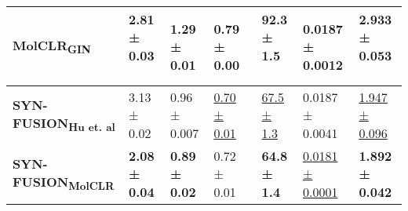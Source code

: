 \documentclass[sigconf,nonacm]{acmart}
\begin{document}
\begin{table*}[!t]
\begin{tabular}[width=0.8\linewidth]{llll|lll}
\textbf{MolCLR}\textsubscript{\textbf{GIN}} \cite{Wang_2022} &2.81 ± 0.03 ~ &1.29 ± 0.01 & 0.79 ± 0.00~ & 92.3 ± 1.5 ~ & 0.0187 ± 0.0012 & 2.933 ± 0.053 ~ \\  

     
       
        \hline

         \textbf{SYN-FUSION}\textsubscript{\textbf{Hu et. al}} & 3.13 ± 0.02 &  0.96 ± 0.007 & \underline{0.70 ± 0.01} & \underline{67.5 ± 1.3} & 0.0187 ± 0.0041 & \underline{1.947 ± 0.096}   \\ 

         \textbf{SYN-FUSION}\textsubscript{\textbf{MolCLR}} & \textbf{2.08 ± 0.04 }& \textbf{0.89 ± 0.02} & 0.72 ± 0.01 & \textbf{64.8 ± 1.4} & \underline{0.0181 ± 0.0001} & \textbf{1.892 ± 0.042}   \\ 
         \hline
\end{tabular}
    \label{tab: Regression}
\end{table*}
\end{document}

